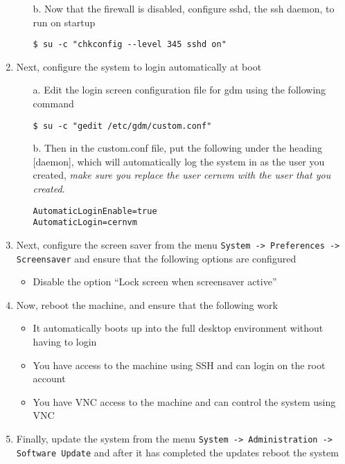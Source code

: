 \begin{enumerate}
\begin{itemize}
\item[b.]	Now that the firewall is disabled, configure sshd, the ssh daemon, to run on startup

\begin{lstlisting}
$ su -c "chkconfig --level 345 sshd on"
\end{lstlisting}
\end{itemize}

\item	Next, configure the system to login automatically at boot
\begin{itemize}
\item[a.]	Edit the login screen configuration file for gdm using the following command
\begin{lstlisting}
$ su -c "gedit /etc/gdm/custom.conf"
\end{lstlisting}

\item[b.]	Then in the custom.conf file, put the following under the heading [daemon], which will automatically
			log the system in as the user you created, \emph{make sure you replace the user cernvm with the user
			that you created}.

\lstset{language=bash,caption=Configure Automatic Login}
\begin{lstlisting}
AutomaticLoginEnable=true
AutomaticLogin=cernvm
\end{lstlisting}		
\end{itemize}

\item	Next, configure the screen saver from the menu \verb|System -> Preferences -> Screensaver| and ensure that
		the following options are configured
\begin{itemize}
\item	Disable the option ``Lock screen when screensaver active''
\end{itemize}

\item	Now, reboot the machine, and ensure that the following work
\begin{itemize}
\item	It automatically boots up into the full desktop environment without having to login
\item	You have access to the machine using SSH and can login on the root account
\item	You have VNC access to the machine and can control the system using VNC	
\end{itemize}

\item	Finally, update the system from the menu \verb|System -> Administration -> Software Update| and after it has 
		completed the updates reboot the system
\end{enumerate}




